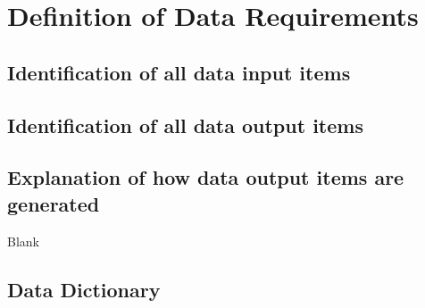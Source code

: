 \section{Definition of Data Requirements}

\subsection{Identification of all data input items}

\subsection{Identification of all data output items}

\subsection{Explanation of how data output items are generated}
Blank
\subsection{Data Dictionary}

